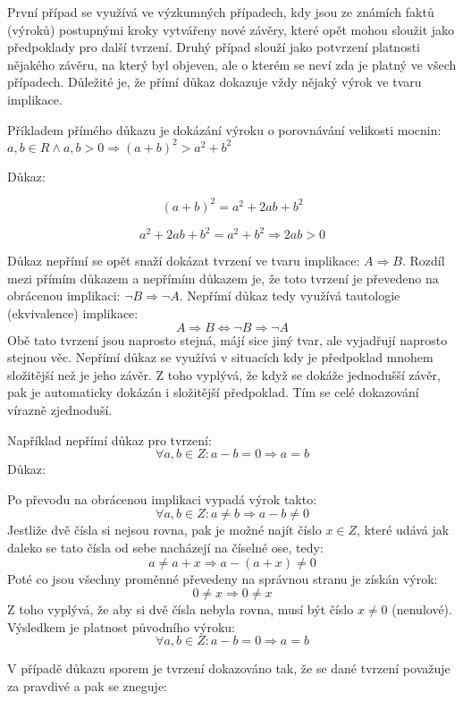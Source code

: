 První případ se využívá ve výzkumných případech, kdy jsou ze známích faktů (výroků) postupnými kroky vytvářeny nové závěry, které opět mohou sloužit jako předpoklady pro další tvrzení. Druhý případ slouží jako potvrzení platnosti nějakého závěru, na který byl objeven, ale o kterém se neví zda je platný ve všech případech. Důležité je, že přímí důkaz dokazuje vždy nějaký výrok ve tvaru implikace.

Příkladem přímého důkazu je dokázání výroku o porovnávání velikosti mocnin: $a,b\in R \wedge a,b>0 \Rightarrow (a+b)^2 > a^2 +b^2 $

Důkaz:

$$ (a+b)^2 = a^2 +2ab +b^2 $$

$$ a^2 + 2ab + b^2 = a^2 + b^2 \Rightarrow 2ab > 0$$


Důkaz nepřímí se opět snaží dokázat tvrzení ve tvaru implikace: $A \Rightarrow B$. Rozdíl mezi přímím důkazem a nepřímím důkazem je, že toto tvrzení je převedeno na obrácenou implikaci: $\neg B \Rightarrow \neg A $. Nepřímí důkaz tedy využívá tautologie (ekvivalence) implikace:
$$A \Rightarrow B \Leftrightarrow \neg B \Rightarrow \neg A $$
Obě tato tvrzení jsou naprosto stejná, májí sice jiný tvar, ale vyjadřují naprosto stejnou věc. Nepřímí důkaz se využívá v situacích kdy je předpoklad mnohem složitější než je jeho závěr. Z toho vyplývá, že když se dokáže jednodušší závěr, pak je automaticky dokázán i složitější předpoklad. Tím se celé dokazování vírazně zjednoduší.

Například nepřímí důkaz pro tvrzení:
$$\forall a,b \in Z: a - b = 0 \Rightarrow a = b$$
Důkaz:

Po převodu na obrácenou implikaci vypadá výrok takto: 
$$\forall a,b \in Z:a \not = b \Rightarrow a - b \not = 0$$
Jestliže dvě čísla si nejsou rovna, pak je možné najít číslo $x \in Z$, které udává jak daleko se tato čísla od sebe nacházejí na číselné ose, tedy:
$$a \not = a+ x \Rightarrow a - (a+x) \not = 0$$
Poté co jsou všechny proměnné převedeny na správnou stranu je získán výrok: 
$$0 \not = x \Rightarrow 0 \not = x$$
Z toho vyplývá, že aby si dvě čísla nebyla rovna, musí být číslo $x \not =0$ (nenulové). Výsledkem je platnost původního výroku:
$$ \forall a,b \in Z: a-b=0 \Rightarrow a = b $$


V případě důkazu sporem je tvrzení dokazováno tak, že se dané tvrzení považuje za pravdivé a pak se zneguje:

